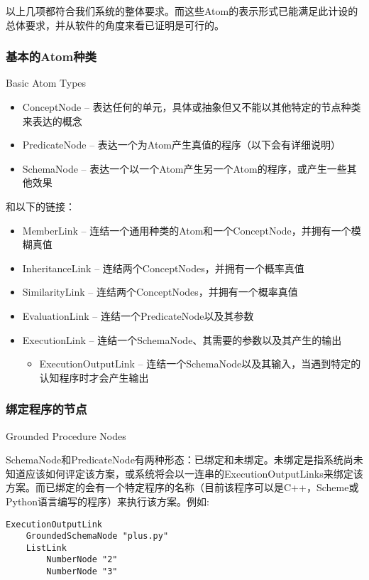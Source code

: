 \noindent 以上几项都符合我们系统的整体要求。而这些Atom的表示形式已能满足此计设的总体要求，并从软件的角度来看已证明是可行的。

\subsubsection{基本的Atom种类}{Basic Atom Types}

\begin{itemize}
\item ConceptNode -- 表达任何的单元，具体或抽象但又不能以其他特定的节点种类来表达的概念
\item PredicateNode  -- 表达一个为Atom产生真值的程序（以下会有详细说明）
\item SchemaNode -- 表达一个以一个Atom产生另一个Atom的程序，或产生一些其他效果
\end{itemize}

和以下的链接：

\begin{itemize}
\item MemberLink -- 连结一个通用种类的Atom和一个ConceptNode，并拥有一个模糊真值
\item InheritanceLink -- 连结两个ConceptNodes，并拥有一个概率真值
\item SimilarityLink -- 连结两个ConceptNodes，并拥有一个概率真值
\item EvaluationLink -- 连结一个PredicateNode以及其参数
\item ExecutionLink -- 连结一个SchemaNode、其需要的参数以及其产生的输出
\begin{itemize}
\item ExecutionOutputLink -- 连结一个SchemaNode以及其输入，当遇到特定的认知程序时才会产生输出
\end{itemize}
\end{itemize}

\subsubsection{绑定程序的节点}{Grounded Procedure Nodes}

SchemaNode和PredicateNode有两种形态：已绑定和未绑定。未绑定是指系统尚未知道应该如何评定该方案，或系统将会以一连串的ExecutionOutputLinks来绑定该方案。而已绑定的会有一个特定程序的名称（目前该程序可以是C++，Scheme或Python语言编写的程序）来执行该方案。例如:

\begin{verbatim}
ExecutionOutputLink
	GroundedSchemaNode "plus.py"
	ListLink
		NumberNode "2"
		NumberNode "3"
\end{verbatim}

